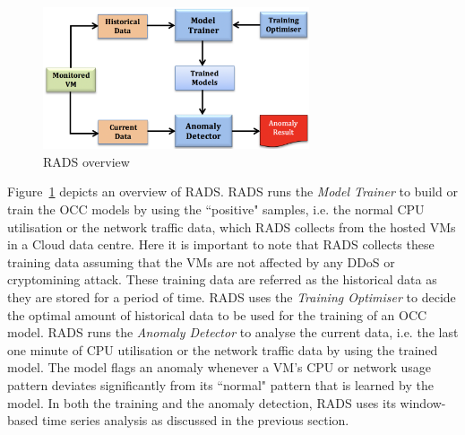 \begin{figure}
  \centering
     \includegraphics[width=0.7\textwidth]{figures/RADS_Overview}
   \caption{RADS overview}
  \label{fig:overview}
\end{figure}

Figure~\ref{fig:overview} depicts an overview of RADS. 
RADS runs the \textit{Model Trainer} to build or train the OCC models by using the ``positive" samples, i.e. the normal CPU utilisation or the network traffic data, which RADS collects from the hosted VMs in a Cloud data centre. Here it is important to note that RADS collects these training data assuming that the VMs are not affected by any DDoS or cryptomining attack. 
These training data are referred as the historical data as they are stored for a period of time. RADS uses the \textit{Training Optimiser} to decide the optimal amount of historical data to be used for the training of an OCC model. RADS runs the \textit{Anomaly Detector} to analyse the current data, i.e. the last one minute of CPU utilisation or the network traffic data by using the trained model. The model flags an anomaly whenever a VM's CPU or network usage pattern deviates significantly from its ``normal" pattern that is learned by the model. 
In both the training and the anomaly detection, RADS uses its window-based time series analysis as discussed in the previous section. 

